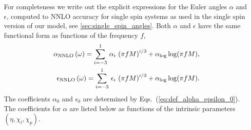 \documentclass[%
aps,
prd,
amssymb,
amsmath,
amsfonts,
eqsecnum,
showpacs,
nofootinbib,
floatfix,
twocolumn,
twoside,
a4paper,
superscriptaddress
]{revtex4-1}
\begin{document}
For completeness we write out the explicit expressions for the Euler angles $\alpha$ and $\epsilon$, computed to NNLO accuracy for single spin systems as used in the single spin version of our model, see \ref{sec:single_spin_angles}.
Both $\alpha$ and $\epsilon$ have the same functional form as functions of the frequency $f$,
\begin{eqnarray}
\alpha_{\rm{NNLO}} \, (\omega) = \sum^1_{i=-3} \, \alpha_i \, \left( \pi f M \right)^{i/3} + \alpha_{\log} \log (\pi f M),\\
\epsilon_{\rm{NNLO}} \, (\omega) = \sum^1_{i=-3} \, \epsilon_i \, \left( \pi f M \right)^{i/3} + \alpha_{\log} \log (\pi f M).
\end{eqnarray}
%
The coefficients $\alpha_{0}$ and 
$\epsilon_0$ are determined by Eqs.~(\ref{eq:def_alpha_epsilon_0}). The coefficients for $\alpha$  are listed below as functions of the intrinsic parameters $(\eta, \chi_l, \chi_p)$.
\end{document}
